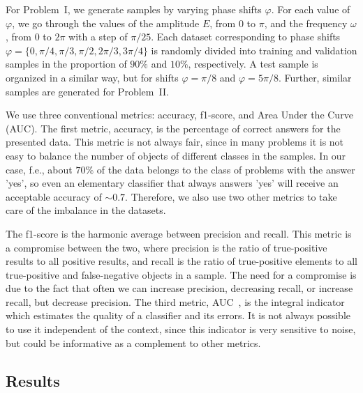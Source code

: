 \documentclass[%
 aip,
 floatfix,
 amsmath,amssymb,
 reprint,%
]{revtex4-1}
\begin{document}
For Problem~I, we generate samples by varying phase shifts $\varphi$. For each value of $\varphi$, we go through the values of the amplitude $E$, from 0 to $\pi$, and the frequency $\omega$, from 0 to $2\pi$ with a step of $\pi/25$. Each dataset corresponding to phase shifts $\varphi = \lbrace 0, \pi / 4, \pi / 3, \pi / 2, 2\pi / 3, 3\pi / 4 \rbrace$ is randomly divided into training and validation samples in the proportion of $90\%$ and $10\%$, respectively. A test sample is organized in a similar way, but for shifts $\varphi = \pi/8$ and $\varphi = 5\pi/8$. Further, similar samples are generated for Problem~II. 


We use three conventional metrics: accuracy, f1-score, and Area Under the Curve (AUC). The first metric, accuracy, is the percentage of correct answers for the presented data. This metric is not always fair, since in many problems it is not easy to balance the number of objects of different classes in the samples. In our case, f.e., about $70\%$ of the data belongs to the class of problems with the answer 'yes', so even an elementary classifier that always answers 'yes' will receive an acceptable accuracy of $\sim 0.7$. Therefore, we also use two other metrics to take care of the imbalance in the datasets.


The f1-score \cite{X21}  is the harmonic average between precision and recall. This metric is a compromise between the two, where precision is the ratio of true-positive results to all positive results, and recall is the ratio of true-positive elements to all true-positive and false-negative objects in a sample. The need for a compromise is due to the fact that often we can increase precision, decreasing recall, or increase recall, but decrease precision. The third metric, AUC~\cite{X22}, is the integral indicator which estimates the quality of a classifier and its errors. It is not always possible to use it independent of the context, since this indicator is very sensitive to noise, but could be informative as a complement to other metrics.

\subsection{Results}
\end{document}
